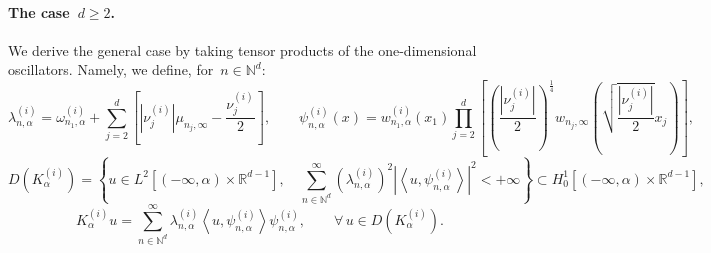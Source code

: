 \documentclass[10pt]{article}
\newcommand{\R}{\mathbb{R}}
\newcommand{\N}{\mathbb N}
\newcommand{\1}{\mathbbm 1}
\newcommand{\Ki}[1]{K^{(i)}_{#1}}
\newcommand{\psii}[2]{\psi^{(i)}_{#1,#2}}
\newcommand{\wi}[2]{w^{(i)}_{#1,#2}}
\newcommand{\lambdai}[2]{\lambda^{(i)}_{#1,#2}}
\newcommand{\omegai}[2]{\omega^{(i)}_{#1,#2}}
\begin{document}

    \paragraph{The case~$d\geq2$.\newline}
    We derive the general case by taking tensor products of the one-dimensional oscillators.
    Namely, we define, for~$n\in\N^d$:
    \begin{equation}
        \label{eq:full_harmonic_eigenstates}
        \lambdai{n}{\alpha} = \omegai{n_1}{\alpha} + \sum_{j=2}^{d}\left[|\nu_j^{(i)}|\mu_{n_j,\infty} - \frac{\nu_j^{(i)}}2\right],\qquad\psii{n}{\alpha}(x)= \wi{n_1}{\alpha}(x_1)\prod_{j=2}^d \left[\left(\frac{|\nu_j^{(i)}|}{2}\right)^{\frac14}w_{n_j,\infty}\left(\sqrt{\frac{|\nu^{(i)}_j|}2}x_j\right)\right],
    \end{equation}
    \begin{equation}
        \label{eq:full_harmonic_domain}
        D(\Ki{\alpha}) = \left\{u\in L^2\left[(-\infty,\alpha)\times\R^{d-1}\right],\quad\sum_{n\in\N^d}^\infty \left(\lambdai{n}{\alpha}\right)^2 \left|\left\langle u,\psii{n}{\alpha}\right\rangle\right|^2 < +\infty\right\}\subset H_0^1\left[(-\infty,\alpha)\times\R^{d-1}\right],
    \end{equation}
    \begin{equation}
        \label{eq:full_harmonic_expression}
        \Ki{\alpha}u = \sum_{n\in\N^d}^\infty \lambdai{n}{\alpha}\left\langle u ,\psii{n}{\alpha}\right\rangle \psii{n}{\alpha},\qquad \forall\, u\in D(\Ki{\alpha}).
    \end{equation}
\end{document}
